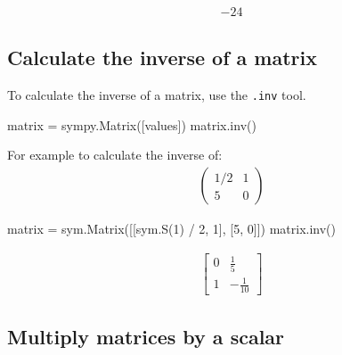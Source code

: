 \begin{equation*}
\begin{split}\displaystyle -24\end{split}
\end{equation*}




\subsection{Calculate the inverse of a matrix}
\label{\detokenize{tools-for-mathematics/04-matrices/how/main:calculate-the-inverse-of-a-matrix}}

To calculate the inverse of a matrix, use the \texttt{.inv} tool.


\begin{api}
matrix = sympy.Matrix([values])
matrix.inv()
\end{api}



For example to
calculate the inverse of:
\begin{equation*}
\begin{split}
    \begin{pmatrix}
        1 / 2 & 1\\
        5     & 0
    \end{pmatrix}
\end{split}
\end{equation*}



\begin{pyin}
matrix = sym.Matrix([[sym.S(1) / 2, 1], [5, 0]])
matrix.inv()
\end{pyin}




\begin{equation*}
\begin{split}\displaystyle \left[\begin{matrix}0 & \frac{1}{5}\\1 & - \frac{1}{10}\end{matrix}\right]\end{split}
\end{equation*}




\subsection{Multiply matrices by a scalar}
\label{\detokenize{tools-for-mathematics/04-matrices/how/main:multiply-matrices-by-a-scalar}}


